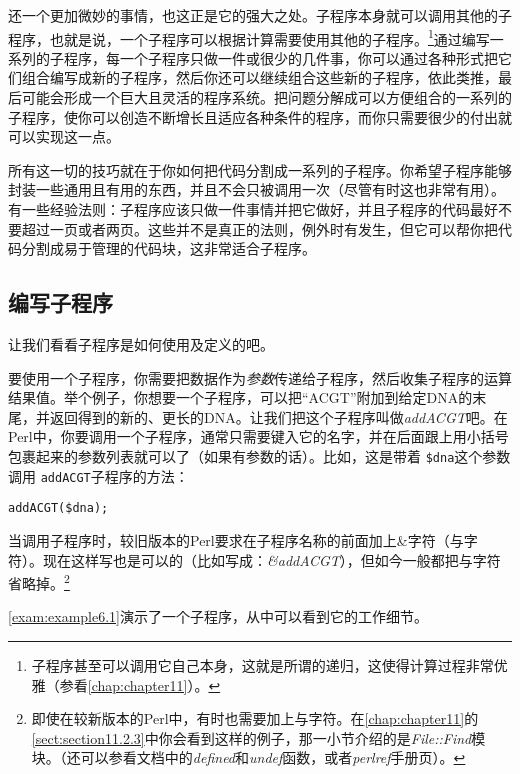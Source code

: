 还一个更加微妙的事情，也这正是它的强大之处。子程序本身就可以调用其他的子程序，也就是说，一个子程序可以根据计算需要使用其他的子程序。\footnote{子程序甚至可以调用它自己本身，这就是所谓的递归，这使得计算过程非常优雅（参看\autoref{chap:chapter11}）。}通过编写一系列的子程序，每一个子程序只做一件或很少的几件事，你可以通过各种形式把它们组合编写成新的子程序，然后你还可以继续组合这些新的子程序，依此类推，最后可能会形成一个巨大且灵活的程序系统。把问题分解成可以方便组合的一系列的子程序，使你可以创造不断增长且适应各种条件的程序，而你只需要很少的付出就可以实现这一点。

所有这一切的技巧就在于你如何把代码分割成一系列的子程序。你希望子程序能够封装一些通用且有用的东西，并且不会只被调用一次（尽管有时这也非常有用）。有一些经验法则：子程序应该只做一件事情并把它做好，并且子程序的代码最好不要超过一页或者两页。这些并不是真正的法则，例外时有发生，但它可以帮你把代码分割成易于管理的代码块，这非常适合子程序。

\subsection{编写子程序}
让我们看看子程序是如何使用及定义的吧。

要使用一个子程序，你需要把数据作为\textit{参数}传递给子程序，然后收集子程序的运算结果值。举个例子，你想要一个子程序，可以把“ACGT”附加到给定DNA的末尾，并返回得到的新的、更长的DNA。让我们把这个子程序叫做\textit{addACGT}吧。在Perl中，你要调用一个子程序，通常只需要键入它的名字，并在后面跟上用小括号包裹起来的参数列表就可以了（如果有参数的话）。比如，这是带着  \verb|$dna|这个参数调用  \verb|addACGT|子程序的方法：

\begin{lstlisting}
addACGT($dna);
\end{lstlisting}

当调用子程序时，较旧版本的Perl要求在子程序名称的前面加上\&字符（与字符）。现在这样写也是可以的（比如写成：\textit{\&addACGT}），但如今一般都把与字符省略掉。\footnote{即使在较新版本的Perl中，有时也需要加上与字符。在\autoref{chap:chapter11}的\autoref{sect:section11.2.3}中你会看到这样的例子，那一小节介绍的是\textit{File::Find}模块。（还可以参看文档中的\textit{defined}和\textit{undef}函数，或者\textit{perlref}手册页）。}

\autoref{exam:example6.1}演示了一个子程序，从中可以看到它的工作细节。



